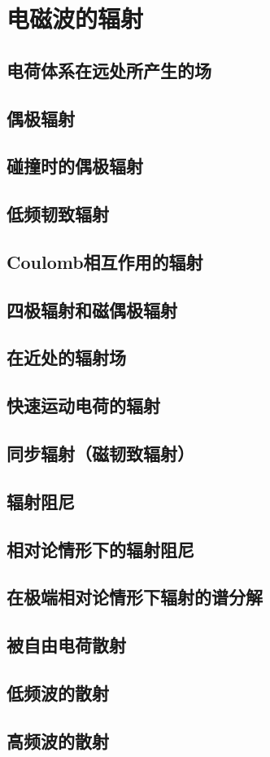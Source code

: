 \chapter{电磁波的辐射}

\section{电荷体系在远处所产生的场}

\section{偶极辐射}

\section{碰撞时的偶极辐射}

\section{低频韧致辐射}

\section{Coulomb相互作用的辐射}

\section{四极辐射和磁偶极辐射}

\section{在近处的辐射场}

\section{快速运动电荷的辐射}

\section{同步辐射（磁韧致辐射）}

\section{辐射阻尼}

\section{相对论情形下的辐射阻尼}

\section{在极端相对论情形下辐射的谱分解}

\section{被自由电荷散射}

\section{低频波的散射}

\section{高频波的散射}